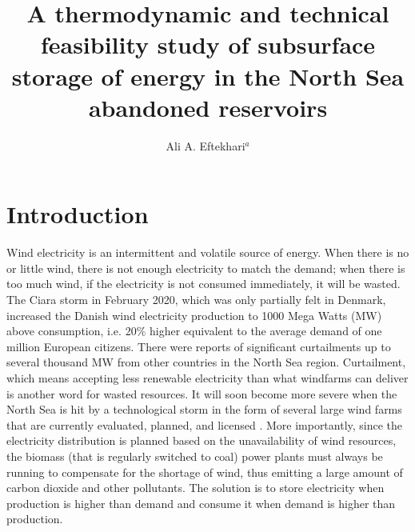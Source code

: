 \documentclass{ECOS_2021}
\title{\sffamily A thermodynamic and technical feasibility study of subsurface storage of energy in the North Sea abandoned reservoirs}
\author{Ali A. Eftekhari$^{a}$}
\begin{document}

\sffamily \Large \section{Introduction} \label{Introduction} 
\rmfamily \normalsize 

Wind electricity is an intermittent and volatile source of energy.
When there is no or little wind, there is not enough electricity to
match the demand; when there is too much wind, if the electricity
is not consumed immediately, it will be wasted. The Ciara storm in
February 2020, which was only partially felt in Denmark, increased
the Danish wind electricity production to 1000 Mega Watts (MW) above
consumption, i.e. 20\% higher equivalent to the average demand of
one million European citizens. There were reports of significant curtailments
up to several thousand MW from other countries in the North Sea region.
Curtailment, which means accepting less renewable electricity than
what windfarms can deliver is another word for wasted resources. It
will soon become more severe when the North Sea is hit by a technological
storm in the form of several large wind farms that are currently evaluated,
planned, and licensed \cite{GlobalOffshoreRenewable}. More importantly,
since the electricity distribution is planned based on the unavailability
of wind resources, the biomass (that is regularly switched to coal)
power plants must always be running to compensate for the shortage
of wind, thus emitting a large amount of carbon dioxide and other
pollutants. The solution is to store electricity when production is
higher than demand and consume it when demand is higher than production. 
\end{document}
